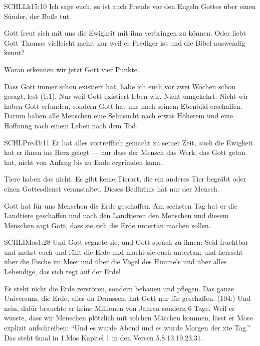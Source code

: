 \begin{otsblock}
\begin{otsblock}
\begin{bibelbox}{SCHL}{Lk}{15:10}
        Ich sage euch, so ist auch Freude vor den Engeln Gottes über einen Sünder, der Buße tut.
        \end{bibelbox}
        Gott freut sich mit uns die Ewigkeit mit ihm verbringen zu können. Oder liebt Gott Thomas vielleicht mehr, nur weil er Prediger ist und die Bibel auswendig kennt? 
        \end{otsblock}
        Woran erkennen wir jetzt Gott vier Punkte. 
        \\
        \begin{otsblock}
        Dass Gott immer schon existiert hat, habe ich euch vor zwei Wochen schon gesagt, lest (1:1). Nur weil Gott existiert leben wir. Nicht umgekehrt. Nicht wir haben Gott erfunden, sondern Gott hat uns nach seinem Ebenbild erschaffen. Darum haben alle Menschen eine Sehnsucht nach etwas Höherem und eine Hoffnung nach einem Leben nach dem Tod.
        \begin{bibelbox}{SCHL}{Pred}{3:11}
        Er hat alles vortrefflich gemacht zu seiner Zeit, auch die Ewigkeit hat er ihnen ins Herz gelegt — nur dass der Mensch das Werk, das Gott getan hat, nicht von Anfang bis zu Ende ergründen kann.
        \end{bibelbox}
        Tiere haben das nicht. Es gibt keine Tierart, die ein anderes Tier begräbt oder einen Gottesdienst veranstaltet. Dieses Bedürfnis hat nur der Mensch.
        \\
        \end{otsblock}
        \begin{otsblock}
        Gott hat für uns Menschen die Erde geschaffen. Am sechsten Tag hat er die Landtiere geschaffen und nach den Landtieren den Menschen und diesem Menschen sagt Gott, dass sie sich die Erde untertan machen sollen. 
        \begin{bibelbox}{SCHL}{IMos}{1:28}
        Und Gott segnete sie; und Gott sprach zu ihnen: Seid fruchtbar und mehrt euch und füllt die Erde und macht sie euch untertan; und herrscht über die Fische im Meer und über die Vögel des Himmels und über alles Lebendige, das sich regt auf der Erde!
        \end{bibelbox}
        Es steht nicht die Erde zerstören, sondern bebauen und pflegen. Das ganze Universum, die Erde, alles da Draussen, hat Gott nur für  geschaffen. (104:) Und nein, dafür brauchte er keine Millionen von Jahren sondern 6 Tage. Weil er wusste, dass wir Menschen plötzlich mit solchen Märchen kommen, lässt er Mose explizit aufschreiben: \enquote{Und es wurde Abend und es wurde Morgen der xte Tag.} Das steht 6mal in 1.Mos Kapitel 1 in den Versen 5.8.13.19.23.31.


\end{otsblock}
\end{otsblock}
